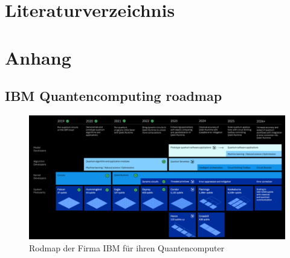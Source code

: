 \documentclass[conference]{IEEEtran}
\begin{document}

\section*{Literaturverzeichnis}
\printbibliography[heading=none]{}

\pagebreak
\section{Anhang}

\subsection{IBM Quantencomputing roadmap}
\begin{figure}[!hbt]
  \centering
  \includegraphics[width=\textwidth]{./images/ibm-roadmap.png}
  \caption{Rodmap der Firma IBM für ihren Quantencomputer \cite{noauthor_ibm_2015}}
  \label{fig:ibm-rm}
\end{figure}
\end{document}
